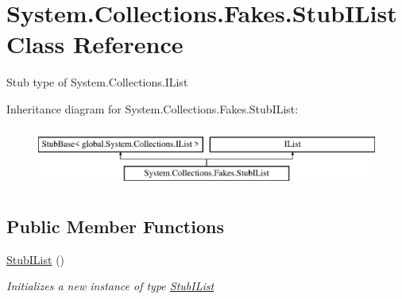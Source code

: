 \hypertarget{class_system_1_1_collections_1_1_fakes_1_1_stub_i_list}{\section{System.\-Collections.\-Fakes.\-Stub\-I\-List Class Reference}
\label{class_system_1_1_collections_1_1_fakes_1_1_stub_i_list}
}


Stub type of System.\-Collections.\-I\-List 


Inheritance diagram for System.\-Collections.\-Fakes.\-Stub\-I\-List\-:\begin{figure}[H]
\begin{center}
\leavevmode
\includegraphics[height=2.000000cm]{class_system_1_1_collections_1_1_fakes_1_1_stub_i_list}
\end{center}
\end{figure}
\subsection*{Public Member Functions}
\begin{DoxyCompactItemize}
\item 
\hyperlink{class_system_1_1_collections_1_1_fakes_1_1_stub_i_list_aa9104cc82eb9cd29e6623e61d87e3ce5}{Stub\-I\-List} ()
\begin{DoxyCompactList}\small\item\em Initializes a new instance of type \hyperlink{class_system_1_1_collections_1_1_fakes_1_1_stub_i_list}{Stub\-I\-List}\end{DoxyCompactList}\end{DoxyCompactItemize}
